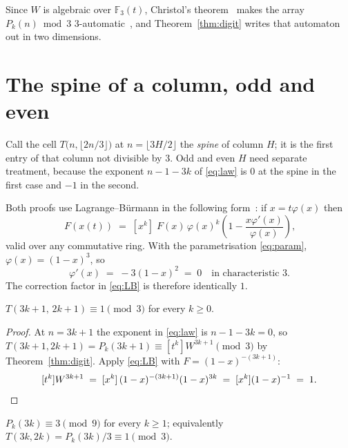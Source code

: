 \documentclass[11pt]{article}
\newcommand{\F}{\mathbb{F}}
\begin{document}
Since $W$ is algebraic over $\F_3(t)$, Christol's
theorem~\cite{christol1980} makes the array $P_k(n) \bmod 3$
$3$-automatic~\cite{allouche2003}, and Theorem~\ref{thm:digit} writes that
automaton out in two dimensions.

\section{The spine of a column, odd and even}

Call the cell $T\bigl(n, \lfloor 2n/3 \rfloor\bigr)$ at
$n = \lfloor 3H/2\rfloor$ the \emph{spine} of column $H$; it is the first entry
of that column not divisible by $3$. Odd and even $H$ need separate treatment,
because the exponent $n-1-3k$ of \eqref{eq:law} is $0$ at the spine in the first
case and $-1$ in the second.

Both proofs use Lagrange--B\"urmann in the following form~\cite[Ch.~5]{stanley2012}:
if $x = t\varphi(x)$ then
\begin{equation}
  [t^k]\,F(x(t)) \;=\; [x^k]\;F(x)\,\varphi(x)^k
  \left(1 - \frac{x\varphi'(x)}{\varphi(x)}\right),
  \label{eq:LB}
\end{equation}
valid over any commutative ring. With the parametrisation \eqref{eq:param},
$\varphi(x) = (1-x)^3$, so
\[
  \varphi'(x) \;=\; -3(1-x)^2 \;=\; 0 \quad\text{in characteristic } 3 .
\]
The correction factor in \eqref{eq:LB} is therefore identically $1$.

\begin{theorem}
\label{thm:oddspine}
$T(3k+1,\,2k+1) \equiv 1 \pmod 3$ for every $k \ge 0$.
\end{theorem}

\begin{proof}
At $n = 3k+1$ the exponent in \eqref{eq:law} is $n-1-3k = 0$, so
$T(3k+1,2k+1) = P_k(3k+1) \equiv [t^k]W^{3k+1} \pmod 3$ by
Theorem~\ref{thm:digit}. Apply \eqref{eq:LB} with $F = (1-x)^{-(3k+1)}$:
\[
  [t^k]W^{3k+1} \;=\; [x^k]\,(1-x)^{-(3k+1)}(1-x)^{3k}
  \;=\; [x^k](1-x)^{-1} \;=\; 1 .
  \qedhere
\]
\end{proof}

\begin{theorem}
\label{thm:evenspine}
$P_k(3k) \equiv 3 \pmod 9$ for every $k \ge 1$; equivalently
$T(3k,2k) = P_k(3k)/3 \equiv 1 \pmod 3$.
\end{theorem}
\end{document}
